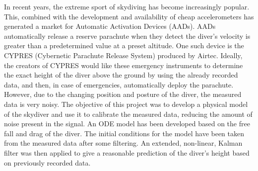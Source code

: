 
In recent years, the extreme sport of skydiving has become increasingly popular. This, combined with the development
and availability of cheap accelerometers has generated a market for Automatic Activation Devices (AADs). AADs
automatically release a reserve parachute when they detect the diver's velocity is greater than a predetermined
value at a preset altitude. One such device is the CYPRES (Cybernetic Parachute Release System) produced by Airtec.
Ideally, the creators of CYPRES would like these emergency instruments to determine the exact height of the diver above the ground by using the already recorded data, and then, in case of emergencies, automatically deploy the parachute. However, due to the changing position and posture of the diver, the measured data
is very noisy. The objective of this project was to develop a physical model of the skydiver and use it to calibrate the measured data, reducing the amount of noise present in the signal. An ODE model has been developed based on the free fall and drag of the diver. The initial conditions for the model have been taken from the measured data after some filtering. An extended, non-linear, Kalman filter was then applied to give a reasonable prediction of the diver's height based on previously recorded data.

